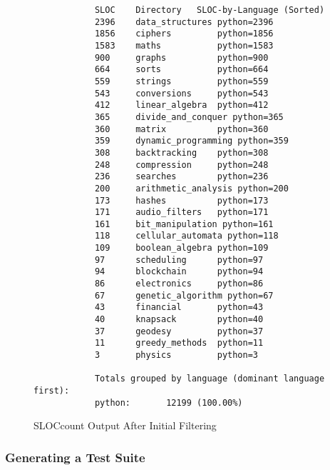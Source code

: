 \begin{figure}[!htb]
	\begin{center}
		\begin{lstlisting}
            SLOC	Directory	SLOC-by-Language (Sorted)
            2396    data_structures python=2396
            1856    ciphers         python=1856
            1583    maths           python=1583
            900     graphs          python=900
            664     sorts           python=664
            559     strings         python=559
            543     conversions     python=543
            412     linear_algebra  python=412
            365     divide_and_conquer python=365
            360     matrix          python=360
            359     dynamic_programming python=359
            308     backtracking    python=308
            248     compression     python=248
            236     searches        python=236
            200     arithmetic_analysis python=200
            173     hashes          python=173
            171     audio_filters   python=171
            161     bit_manipulation python=161
            118     cellular_automata python=118
            109     boolean_algebra python=109
            97      scheduling      python=97
            94      blockchain      python=94
            86      electronics     python=86
            67      genetic_algorithm python=67
            43      financial       python=43
            40      knapsack        python=40
            37      geodesy         python=37
            11      greedy_methods  python=11
            3       physics         python=3

            Totals grouped by language (dominant language first):
            python:       12199 (100.00%)
        \end{lstlisting}
		\caption{\label{fig:SLOCcount_phase1} SLOCcount Output After Initial Filtering}
	\end{center}
\end{figure}


\subsubsection{Generating a Test Suite}
\label{subsubsec:generating_test_suite}

